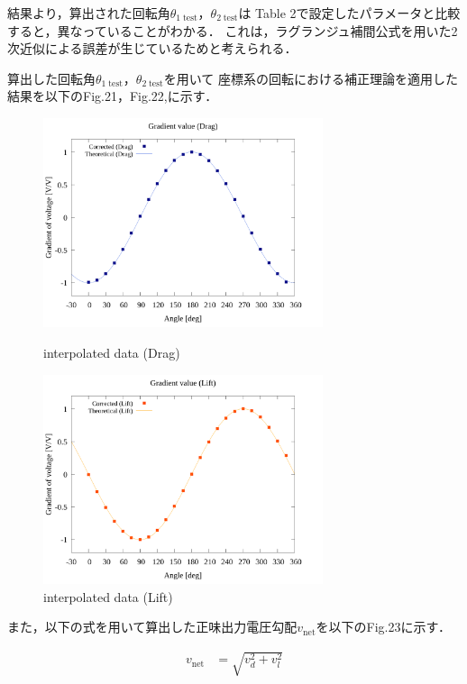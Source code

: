 \documentclass[twocolumn,a4j]{jsarticle}
\begin{document}
結果より，算出された回転角$\theta_{1\;\mathrm{test}}$，$\theta_{2\;\mathrm{test}}$は
Table 2で設定したパラメータと比較すると，異なっていることがわかる．
これは，ラグランジュ補間公式を用いた2次近似による誤差が生じているためと考えられる．

算出した回転角$\theta_{1\;\mathrm{test}}$，$\theta_{2\;\mathrm{test}}$を用いて
座標系の回転における補正理論を適用した結果を以下のFig.21，Fig.22,に示す．

\newpage

\begin{figure}[htbp]
    \footnotesize
    \begin{center}
        \includegraphics[width=82mm]{../../../02_workspace/result/simulation_tx=10.0_ty=-5.0_dx=5.00_dy=-2.50/plot/21/21-4_corrected_angle_drag.png}
        \caption{interpolated data (Drag)}
        \includegraphics[width=82mm]{../../../02_workspace/result/simulation_tx=10.0_ty=-5.0_dx=5.00_dy=-2.50/plot/21/21-4_corrected_angle_lift.png}
        \caption{interpolated data (Lift)}
    \end{center}
\end{figure}

また，以下の式を用いて算出した正味出力電圧勾配$v_{\mathrm{net}}$を以下のFig.23に示す．

\begin{align*}
    v_{\mathrm{net}} &= \sqrt{v_d^2 + v_l^2}
\end{align*}
\end{document}
